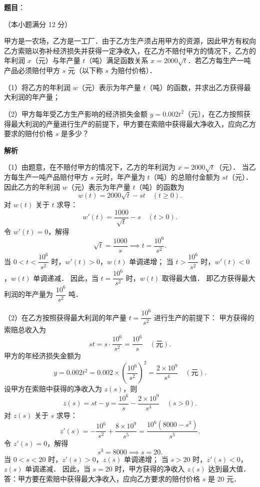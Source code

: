 \begin{answer}

\textbf{题目}：

（本小题满分 12 分）

甲方是一农场，乙方是一工厂．由于乙方生产须占用甲方的资源，因此甲方有权向乙方索赔以弥补经济损失并获得一定净收入，在乙方不赔付甲方的情况下，乙方的年利润 $x$（元）与年产量 $t$（吨）满足函数关系 $x = 2000\sqrt{t}$．若乙方每生产一吨产品必须赔付甲方 $s$ 元（以下称 $s$ 为赔付价格）．

（1）将乙方的年利润 $w$（元）表示为年产量 $t$（吨）的函数，并求出乙方获得最大利润的年产量；

（2）甲方每年受乙方生产影响的经济损失金额 $y = 0.002t^2$（元），在乙方按照获得最大利润的产量进行生产的前提下，甲方要在索赔中获得最大净收入，应向乙方要求的赔付价格 $s$ 是多少？

\textbf{解析}

（1）由题意，在不赔付甲方的情况下，乙方的年利润为 $x = 2000\sqrt{t}$（元）．
当乙方每生产一吨产品赔付甲方 $s$ 元时，年产量为 $t$（吨）的总赔付金额为 $st$（元）．
因此乙方的年利润 $w$（元）表示为年产量 $t$（吨）的函数为
\nopagebreak[4]
\[
w(t) = 2000\sqrt{t} - st \quad (t \geqslant 0).
\]
对 $w(t)$ 关于 $t$ 求导：
\nopagebreak[4]
\[
w'(t) = \frac{1000}{\sqrt{t}} - s \quad (t > 0).
\]
令 $w'(t) = 0$，解得
\nopagebreak[4]
\[
\sqrt{t} = \frac{1000}{s} \implies t = \frac{10^6}{s^2}.
\]
当 $0 < t < \dfrac{10^6}{s^2}$ 时，$w'(t) > 0$，$w(t)$ 单调递增；
当 $t > \dfrac{10^6}{s^2}$ 时，$w'(t) < 0$，$w(t)$ 单调递减．
因此，当 $t = \dfrac{10^6}{s^2}$ 时，$w(t)$ 取得最大值．
即乙方获得最大利润的年产量为 $\dfrac{10^6}{s^2}$ 吨．

（2）在乙方按照获得最大利润的年产量 $t = \dfrac{10^6}{s^2}$ 进行生产的前提下：
甲方获得的索赔总收入为
\nopagebreak[4]
\[
st = s \cdot \frac{10^6}{s^2} = \frac{10^6}{s} \quad (\text{元}).
\]
甲方的年经济损失金额为
\nopagebreak[4]
\[
y = 0.002t^2 = 0.002 \times \left(\frac{10^6}{s^2}\right)^2 = \frac{2 \times 10^9}{s^4} \quad (\text{元}).
\]
设甲方在索赔中获得的净收入为 $z(s)$，则
\nopagebreak[4]
\[
z(s) = st - y = \frac{10^6}{s} - \frac{2 \times 10^9}{s^4} \quad (s > 0).
\]
对 $z(s)$ 关于 $s$ 求导：
\nopagebreak[4]
\[
z'(s) = -\frac{10^6}{s^2} + \frac{8 \times 10^9}{s^5} = \frac{10^6(8000 - s^3)}{s^5}.
\]
令 $z'(s) = 0$，解得
\nopagebreak[4]
\[
s^3 = 8000 \implies s = 20.
\]
当 $0 < s < 20$ 时，$z'(s) > 0$，$z(s)$ 单调递增；
当 $s > 20$ 时，$z'(s) < 0$，$z(s)$ 单调递减．
因此，当 $s = 20$ 时，甲方获得的净收入 $z(s)$ 达到最大值．
答：甲方要在索赔中获得最大净收入，应向乙方要求的赔付价格 $s$ 是 20 元．


\end{answer}
